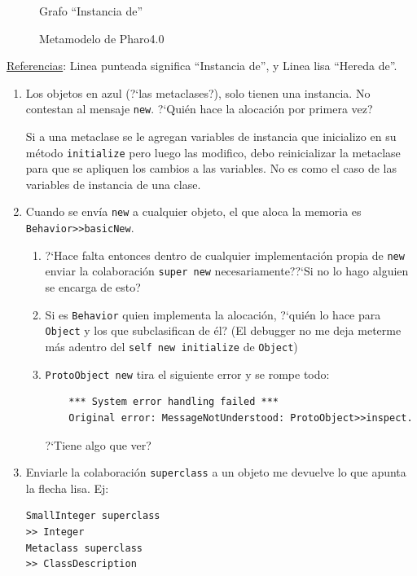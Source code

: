 \documentclass[a4paper, 11pt]{article}
\begin{document}
\begin{figure}[H]
\begin{minipage}{.5\textwidth}
  \caption{Grafo ``Instancia de''}
  \label{fig:sub2}
\end{minipage}
\caption{Metamodelo de Pharo4.0}
\label{fig:test}
\end{figure}

\underline{Referencias}: Linea punteada significa ``Instancia de'', y Linea lisa ``Hereda de''.

\begin{enumerate}
 \item Los objetos en azul (?`las metaclases?), solo tienen una instancia. No contestan al mensaje \texttt{new}. ?`Qui\'en hace la alocaci\'on por primera vez? 
 
 Si a una metaclase se le agregan variables de instancia que inicializo en su m\'etodo \texttt{initialize} pero luego las modifico, debo reinicializar la metaclase para que se apliquen los cambios a las variables. No es como el caso de las variables de instancia de una clase. 
 
 \item Cuando se env\'ia \texttt{new} a cualquier objeto, el que aloca la memoria es \texttt{Behavior>>basicNew}. 
  \begin{enumerate}
    \item ?`Hace falta entonces dentro de cualquier implementaci\'on propia de \texttt{new} enviar la colaboraci\'on \texttt{super new} necesariamente??`Si no lo hago alguien se encarga de esto? 
    \item Si es \texttt{Behavior} quien implementa la alocaci\'on, ?`qui\'en lo hace para \texttt{Object} y los que subclasifican de \'el? (El debugger no me deja meterme m\'as adentro del \texttt{self new initialize} de \texttt{Object})
    
     \item \texttt{ProtoObject new} tira el siguiente error y se rompe todo: 

	\begin{verbatim}
	*** System error handling failed ***
	Original error: MessageNotUnderstood: ProtoObject>>inspect.
	\end{verbatim}

	?`Tiene algo que ver?
    
  \end{enumerate}

 \item Enviarle la colaboraci\'on \texttt{superclass} a un objeto me devuelve lo que apunta la flecha lisa. Ej: 
\begin{verbatim}
SmallInteger superclass
>> Integer
Metaclass superclass
>> ClassDescription
\end{verbatim}


\end{enumerate}
\end{document}
